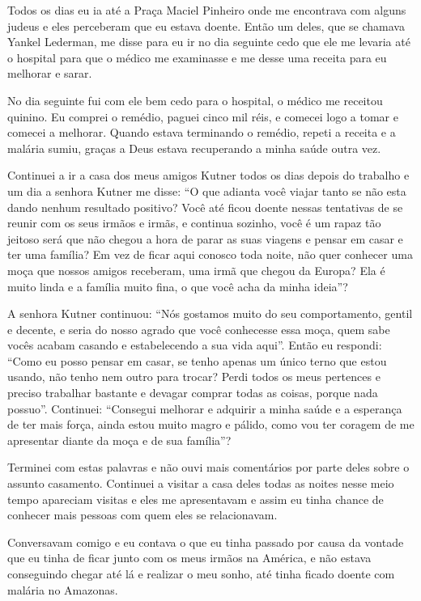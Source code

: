 Todos os dias eu ia até a Praça Maciel Pinheiro onde me encontrava com
alguns judeus e eles perceberam que eu estava doente. Então um deles,
que se chamava Yankel Lederman, me disse para eu ir no dia seguinte cedo
que ele me levaria até o hospital para que o médico me examinasse e me
desse uma receita para eu melhorar e sarar.

No dia seguinte fui com ele bem cedo para o hospital, o médico me
receitou quinino. Eu comprei o remédio, paguei cinco mil réis, e comecei
logo a tomar e comecei a melhorar. Quando estava terminando o remédio,
repeti a receita e a malária sumiu, graças a Deus estava recuperando a
minha saúde outra vez.

Continuei a ir a casa dos meus amigos Kutner todos os dias depois do
trabalho e um dia a senhora Kutner me disse: ``O que adianta você viajar
tanto se não esta dando nenhum resultado positivo? Você até ficou doente
nessas tentativas de se reunir com os seus irmãos e irmãs, e continua
sozinho, você é um rapaz tão jeitoso será que não chegou a hora de parar
as suas viagens e pensar em casar e ter uma família? Em vez de ficar
aqui conosco toda noite, não quer conhecer uma moça que nossos amigos
receberam, uma irmã que chegou da Europa? Ela é muito linda e a família
muito fina, o que você acha da minha ideia''?

A senhora Kutner continuou: ``Nós gostamos muito do seu comportamento,
gentil e decente, e seria do nosso agrado que você conhecesse essa moça,
quem sabe vocês acabam casando e estabelecendo a sua vida aqui''. Então
eu respondi: ``Como eu posso pensar em casar, se tenho apenas um único
terno que estou usando, não tenho nem outro para trocar? Perdi todos os
meus pertences e preciso trabalhar bastante e devagar comprar todas as
coisas, porque nada possuo''. Continuei: ``Consegui melhorar e adquirir
a minha saúde e a esperança de ter mais força, ainda estou muito magro e
pálido, como vou ter coragem de me apresentar diante da moça e de sua
família''?

Terminei com estas palavras e não ouvi mais comentários por parte deles
sobre o assunto casamento. Continuei a visitar a casa deles todas as
noites nesse meio tempo apareciam visitas e eles me apresentavam e assim
eu tinha chance de conhecer mais pessoas com quem eles se relacionavam.

Conversavam comigo e eu contava o que eu tinha passado por causa da
vontade que eu tinha de ficar junto com os meus irmãos na América, e não
estava conseguindo chegar até lá e realizar o meu sonho, até tinha
ficado doente com malária no Amazonas.

